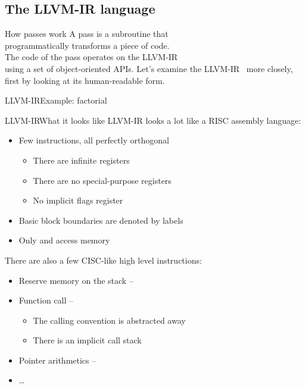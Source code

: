 
\subsection{The LLVM-IR language}


\begin{frame}{How passes work}
\centering
A \alert{pass} is a \alert{subroutine} that \\programmatically
transforms a piece of code.\\
\bigskip
The code of the pass operates on the LLVM-IR \\using a set of
\alert{object-oriented APIs}.
\vfill
Let's examine the LLVM-IR~\cite{LOCAL:www/llvmLanguageRef} more closely,\\
first by looking at its \alert{human-readable} form.
\end{frame}


\begin{frame}{LLVM-IR}{Example: factorial}
\begin{center}
\begin{varwidth}{20cm}
\llvminput[\ttfamily\fontsize{7pt}{5pt}\selectfont]{snippet/fact.ll}
\end{varwidth}
\end{center}
\end{frame}


\begin{frame}{LLVM-IR}{What it looks like}
LLVM-IR looks a lot like a RISC assembly language:\\

\begin{itemize}
\item Few instructions, all perfectly orthogonal
	\begin{itemize}
	\item There are infinite registers
	\item There are no special-purpose registers
	\item No implicit flags register
	\end{itemize}
\item Basic block boundaries are denoted by \alert{labels}
\item Only  and  access memory
\end{itemize}

\vfill
There are also a few CISC-like \alert{high level instructions}:

\begin{itemize}
\item Reserve memory on the stack -- 
\item Function call -- 
	\begin{itemize}
	\item The calling convention is abstracted away
	\item There is an implicit call stack
	\end{itemize}
\item Pointer arithmetics -- 
\item \ldots
\end{itemize}
\end{frame}


